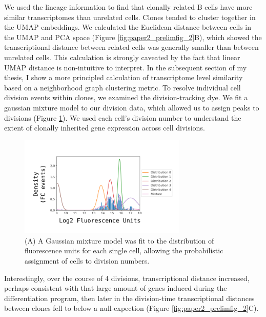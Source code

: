 We used the lineage information to find that clonally related B cells have more similar transcriptomes than unrelated cells. Clones tended to cluster together in the UMAP embeddings. We calculated the Euclidean distance between cells in the UMAP and PCA space (Figure \ref{fig:paper2_prelimfig_2}B), which showed the transcriptional distance between related cells was generally smaller than between unrelated cells. This calculation is strongly caveated by the fact that linear UMAP distance is non-intuitive to interpret. In the subsequent section of my thesis, I show a more principled calculation of transcriptome level similarity based on a neighborhood graph clustering metric. To resolve individual cell division events within clones, we examined the division-tracking dye\cite{hasbold1998cell}. We fit a gaussian mixture model to our division data, which allowed us to assign peaks to divisions (Figure \ref{fig:paper2_CTV_gaussian}). We used each cell’s division number to understand the extent of clonally inherited gene expression across cell divisions. 
\begin{figure}[htb!]
\centering
\includegraphics[width=8cm, keepaspectratio]{figs/prelim_InVitro/gaussian_CTV_model.png}
\caption[Example of Cell Division Tracking Dye data fit with a Gaussian Mixture Model]{(A) A Gaussian mixture model was fit to the distribution of fluorescence units for each single cell, allowing the probabilistic assignment of cells to division numbers.}
\label{fig:paper2_CTV_gaussian}
\end{figure}

Interestingly, over the course of 4 divisions, transcriptional distance increased, perhaps consistent with that large amount of genes induced during the differentiation program, then later in the division-time transcriptional distances between clones fell to below a null-expection  (Figure \ref{fig:paper2_prelimfig_2}C).  


